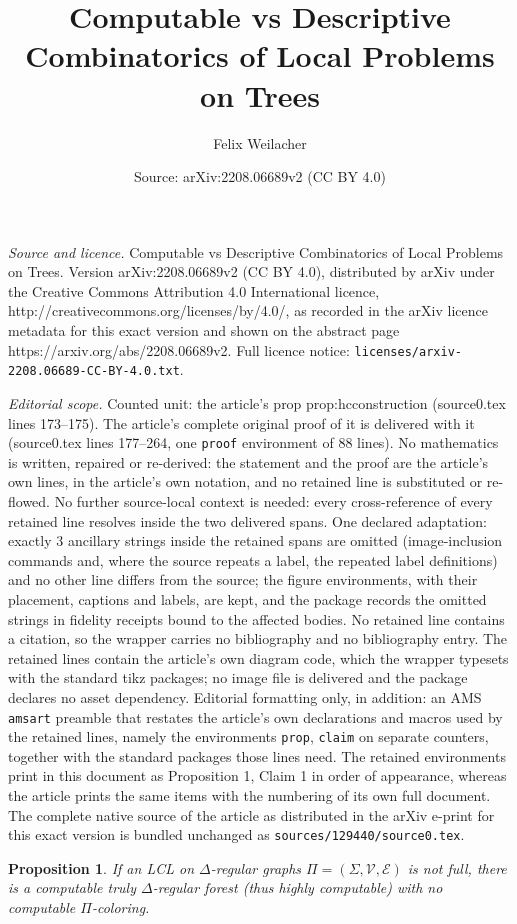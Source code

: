 \documentclass[10pt,a4paper]{amsart}
\title{Computable vs Descriptive Combinatorics of Local Problems on Trees}
\author{Felix Weilacher}
\date{Source: arXiv:2208.06689v2 (CC BY 4.0)}
\newtheorem{prop}{Proposition}
\begin{document}
\maketitle

\noindent\emph{Source and licence.} Computable vs Descriptive Combinatorics of Local Problems on Trees. Version arXiv:2208.06689v2 (CC BY 4.0), distributed by arXiv under the Creative Commons Attribution 4.0 International licence, http://creativecommons.org/licenses/by/4.0/, as recorded in the arXiv licence metadata for this exact version and shown on the abstract page https://arxiv.org/abs/2208.06689v2. Full licence notice: \texttt{licenses/arxiv-2208.06689-CC-BY-4.0.txt}.\par\smallskip

\noindent\textit{Editorial scope.} Counted unit: the article's prop prop:hcconstruction (source0.tex lines 173--175). The article's complete original proof of it is delivered with it (source0.tex lines 177--264, one \texttt{proof} environment of 88 lines). No mathematics is written, repaired or re-derived: the statement and the proof are the article's own lines, in the article's own notation, and no retained line is substituted or re-flowed.  No further source-local context is needed: every cross-reference of every retained line resolves inside the two delivered spans.  One declared adaptation: exactly 3 ancillary strings inside the retained spans are omitted (image-inclusion commands and, where the source repeats a label, the repeated label definitions) and no other line differs from the source; the figure environments, with their placement, captions and labels, are kept, and the package records the omitted strings in fidelity receipts bound to the affected bodies.  No retained line contains a citation, so the wrapper carries no bibliography and no bibliography entry.  The retained lines contain the article's own diagram code, which the wrapper typesets with the standard tikz packages; no image file is delivered and the package declares no asset dependency.  Editorial formatting only, in addition: an AMS \texttt{amsart} preamble that restates the article's own declarations and macros used by the retained lines, namely the environments \texttt{prop}, \texttt{claim} on separate counters, together with the standard packages those lines need.  The retained environments print in this document as Proposition 1, Claim 1 in order of appearance, whereas the article prints the same items with the numbering of its own full document.  The complete native source of the article as distributed in the arXiv e-print for this exact version is bundled unchanged as \texttt{sources/129440/source0.tex}.
\begin{prop}\label{prop:hcconstruction}
        If an LCL on $\Delta$-regular graphs $\Pi = (\Sigma,\mathcal{V},\mathcal{E})$ is not full, there is a computable truly $\Delta$-regular forest (thus highly computable) with no computable $\Pi$-coloring.
\end{prop}
\end{document}
